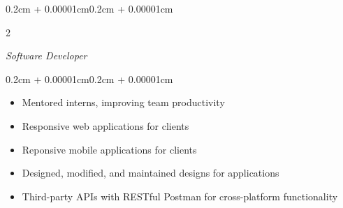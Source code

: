 \documentclass[10pt, letterpaper]{article}
\newenvironment{highlights}{
    \begin{itemize}[
        topsep=0.10cm,
        parsep=0.10cm,
        partopsep=0pt,
        itemsep=0pt,
        leftmargin=0.4cm + 10pt
    ]
}{
    \end{itemize}
}
\newenvironment{onecolentry}{
    \begin{adjustwidth}{0.2cm + 0.00001cm}{0.2cm + 0.00001cm}
}{
    \end{adjustwidth}
}
\newenvironment{twocolentry}[2][]{
    \onecolentry
    \def\secondColumn{#2}
    \setcolumnwidth{\fill, 5.2cm}
    \begin{paracol}{2}
}{
    \switchcolumn \raggedleft \secondColumn
    \end{paracol}
    \endonecolentry
}
\newenvironment{projectentry}{
    \needspace{2.5\baselineskip}
}{
}
\begin{document}
    \begin{projectentry}
    \begin{twocolentry}{
        \textit{}
    }
        \textit{Software Developer}
    \end{twocolentry}
    \vspace{0.10cm}
    \begin{onecolentry}
        \begin{highlights}
            \item Mentored interns, improving team productivity
            \item Responsive web applications for clients
            \item Reponsive mobile applications for clients
            \item Designed, modified, and maintained designs for applications
            \item Third-party APIs with RESTful Postman for cross-platform functionality
        \end{highlights}
    \end{onecolentry}
    \end{projectentry}


\end{document}
